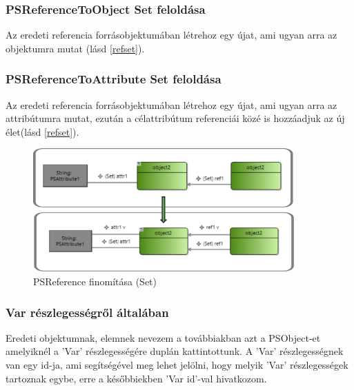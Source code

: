 \subsubsection{PSReferenceToObject Set feloldása}
Az eredeti referencia forrásobjektumában létrehoz egy újat, ami ugyan arra az objektumra mutat (lásd \autoref{refset}).

\subsubsection{PSReferenceToAttribute Set feloldása}
Az eredeti referencia forrásobjektumában létrehoz egy újat, ami ugyan arra az attribútumra mutat, ezután a célattribútum referenciái közé is hozzáadjuk az új élet(lásd \autoref{refset}).
\begin{figure}[!ht]
	\centering
	\includegraphics[width=100mm]{figures/refset.pdf}
	\caption{PSReference finomítása (Set)}
	\label{refset} 
\end{figure}

\subsubsection{Var részlegességről általában}
Eredeti objektumnak, elemnek nevezem a továbbiakban azt a PSObject-et amelyiknél a 'Var' részlegességére duplán kattintottunk. A 'Var' részlegességnek van egy id-ja, ami segítségével meg lehet jelölni, hogy melyik 'Var' részlegességek tartoznak egybe, erre a későbbiekben 'Var id'-val hivatkozom.


